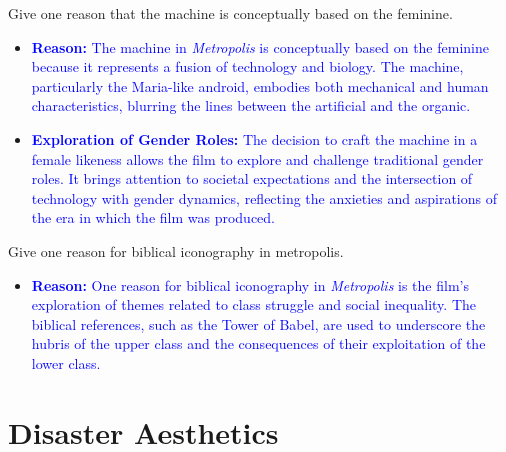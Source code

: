\documentclass[11pt,fleqn]{book}
\begin{document}
\begin{exercise}
    Give one reason that the machine is conceptually based on the feminine.
        \begin{itemize}
            \item \textcolor{blue}{\textbf{Reason:} The machine in \textit{Metropolis} is conceptually based on the feminine because it represents a fusion of technology and biology. The machine, particularly the Maria-like android, embodies both mechanical and human characteristics, blurring the lines between the artificial and the organic.}
            \item \textcolor{blue}{\textbf{Exploration of Gender Roles:} The decision to craft the machine in a female likeness allows the film to explore and challenge traditional gender roles. It brings attention to societal expectations and the intersection of technology with gender dynamics, reflecting the anxieties and aspirations of the era in which the film was produced.}
        \end{itemize}
\end{exercise}

\begin{exercise}
    Give one reason for biblical iconography in metropolis.
        \begin{itemize}
            \item \textcolor{blue}{\textbf{Reason:} One reason for biblical iconography in \textit{Metropolis} is the film's exploration of themes related to class struggle and social inequality. The biblical references, such as the Tower of Babel, are used to underscore the hubris of the upper class and the consequences of their exploitation of the lower class.}
        \end{itemize}
\end{exercise}


\section{Disaster Aesthetics}
\end{document}
